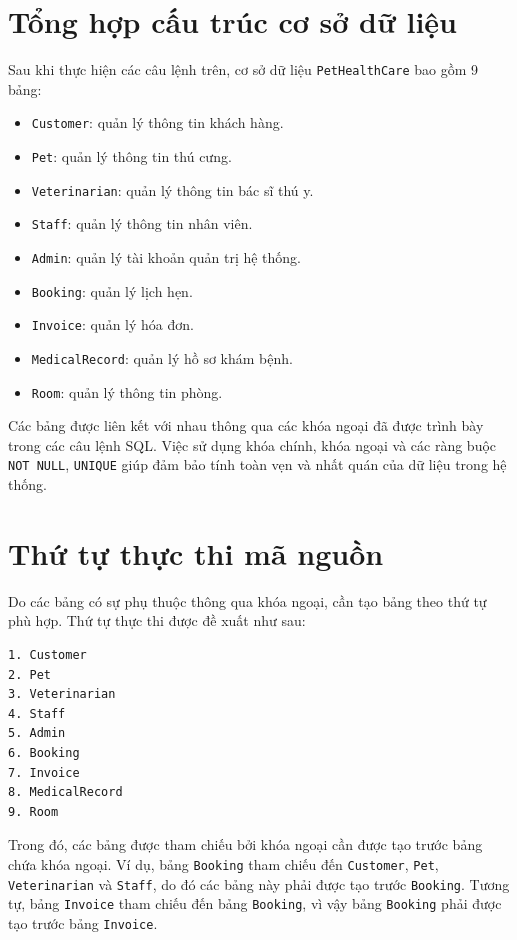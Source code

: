 \section{Tổng hợp cấu trúc cơ sở dữ liệu}
Sau khi thực hiện các câu lệnh trên, cơ sở dữ liệu \texttt{PetHealthCare} bao gồm 9 bảng:

\begin{itemize}
\item \texttt{Customer}: quản lý thông tin khách hàng.
\item \texttt{Pet}: quản lý thông tin thú cưng.
\item \texttt{Veterinarian}: quản lý thông tin bác sĩ thú y.
\item \texttt{Staff}: quản lý thông tin nhân viên.
\item \texttt{Admin}: quản lý tài khoản quản trị hệ thống.
\item \texttt{Booking}: quản lý lịch hẹn.
\item \texttt{Invoice}: quản lý hóa đơn.
\item \texttt{MedicalRecord}: quản lý hồ sơ khám bệnh.
\item \texttt{Room}: quản lý thông tin phòng.
\end{itemize}

Các bảng được liên kết với nhau thông qua các khóa ngoại đã được trình bày trong các câu lệnh SQL. Việc sử dụng khóa chính, khóa ngoại và các ràng buộc \texttt{NOT NULL}, \texttt{UNIQUE} giúp đảm bảo tính toàn vẹn và nhất quán của dữ liệu trong hệ thống.

\section{Thứ tự thực thi mã nguồn}
Do các bảng có sự phụ thuộc thông qua khóa ngoại, cần tạo bảng theo thứ tự phù hợp. Thứ tự thực thi được đề xuất như sau:

\begin{verbatim}
1. Customer
2. Pet
3. Veterinarian
4. Staff
5. Admin
6. Booking
7. Invoice
8. MedicalRecord
9. Room
   \end{verbatim}

Trong đó, các bảng được tham chiếu bởi khóa ngoại cần được tạo trước bảng chứa khóa ngoại. Ví dụ, bảng \texttt{Booking} tham chiếu đến \texttt{Customer}, \texttt{Pet}, \texttt{Veterinarian} và \texttt{Staff}, do đó các bảng này phải được tạo trước \texttt{Booking}.
Tương tự, bảng \texttt{Invoice} tham chiếu đến bảng \texttt{Booking}, vì vậy bảng \texttt{Booking} phải được tạo trước bảng \texttt{Invoice}.

